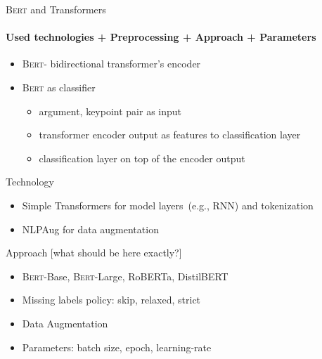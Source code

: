 \documentclass[english,handout]{mlutalk}
\newcommand{\Bert}{\textsc{Bert}\xspace}
\newcommand{\todo}[1]{{\smaller\color{red}[#1]}}
\begin{document}
\begin{frame}{\Bert and Transformers}
  \framesubtitle{Used technologies + Preprocessing + Approach + Parameters}

  \begin{itemize}
    \item \Bert - bidirectional transformer’s encoder~\cite{devlin-etal-2019-bert}
    \item \Bert as classifier
    	\begin{itemize}
    		\item argument, keypoint pair as input
    		\item transformer encoder output as features to classification layer
    		\item classification layer on top of the encoder output
    	\end{itemize}
  \end{itemize}
  
  \begin{block}{Technology}
    \begin{itemize}
      \item Simple Transformers\cite{Rajapaske2019} for model layers~(e.g., RNN) and tokenization
      \item NLPAug\cite{Edward2019} for data augmentation
    \end{itemize}
  \end{block}
  
    \begin{block}{Approach \todo{what should be here exactly?}}
    \begin{itemize}
    		\item \Bert -Base, \Bert -Large, RoBERTa, DistilBERT
    		\item Missing labels policy: skip, relaxed, strict
    		\item Data Augmentation
    		\item Parameters: batch size, epoch, learning-rate
    \end{itemize}
    
  \end{block}

\end{frame}
\end{document}
